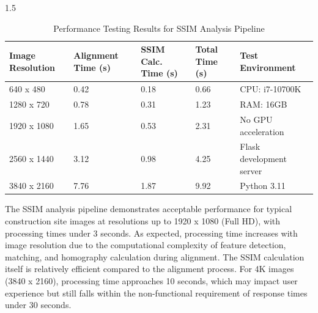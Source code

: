 \documentclass[12pt,a4paper]{report}
\begin{document}
\begin{spacing}{1.5}
    \begin{table}[H]
        \centering
        \caption{Performance Testing Results for SSIM Analysis Pipeline}
        \label{tab:ssim_perf}
        \begin{tabular}{|p{3cm}|p{2.5cm}|p{2.5cm}|p{2.5cm}|p{3cm}|}
            \hline
            \textbf{Image Resolution} & \textbf{Alignment Time (s)} & \textbf{SSIM Calc. Time (s)} & \textbf{Total Time (s)} & \textbf{Test Environment} \\
            \hline
            640 x 480                 & 0.42                        & 0.18                         & 0.66                    & CPU: i7-10700K            \\
            \hline
            1280 x 720                & 0.78                        & 0.31                         & 1.23                    & RAM: 16GB                 \\
            \hline
            1920 x 1080               & 1.65                        & 0.53                         & 2.31                    & No GPU acceleration       \\
            \hline
            2560 x 1440               & 3.12                        & 0.98                         & 4.25                    & Flask development server  \\
            \hline
            3840 x 2160               & 7.76                        & 1.87                         & 9.92                    & Python 3.11               \\
            \hline
        \end{tabular}
    \end{table}

    The SSIM analysis pipeline demonstrates acceptable performance for typical construction site images at resolutions up to 1920 x 1080 (Full HD), with processing times under 3 seconds. As expected, processing time increases with image resolution due to the computational complexity of feature detection, matching, and homography calculation during alignment. The SSIM calculation itself is relatively efficient compared to the alignment process. For 4K images (3840 x 2160), processing time approaches 10 seconds, which may impact user experience but still falls within the non-functional requirement of response times under 30 seconds.


\end{spacing}
\end{document}
